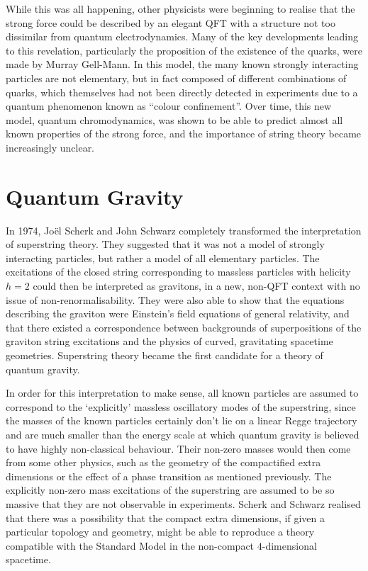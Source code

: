 \documentclass[12pt]{article}
\begin{document}
While this was all happening, other physicists were beginning to realise that the strong force could be described by an elegant QFT with a structure not too dissimilar from quantum electrodynamics. Many of the key developments leading to this revelation, particularly the proposition of the existence of the quarks, were made by Murray Gell-Mann. In this model, the many known strongly interacting particles are not elementary, but in fact composed of different combinations of quarks, which themselves had not been directly detected in experiments due to a quantum phenomenon known as ``colour confinement''. Over time, this new model, quantum chromodynamics, was shown to be able to predict almost all known properties of the strong force, and the importance of string theory became increasingly unclear.

\section{Quantum Gravity}

In 1974, Joël Scherk and John Schwarz completely transformed the interpretation of superstring theory. They suggested that it was not a model of strongly interacting particles, but rather a model of all elementary particles. The excitations of the closed string corresponding to massless particles with helicity $h=2$ could then be interpreted as gravitons, in a new, non-QFT context with no issue of non-renormalisability. They were also able to show that the equations describing the graviton were Einstein's field equations of general relativity, and that there existed a correspondence between backgrounds of superpositions of the graviton string excitations and the physics of curved, gravitating spacetime geometries. Superstring theory became the first candidate for a theory of quantum gravity.
\newline

In order for this interpretation to make sense, all known particles are assumed to correspond to the `explicitly' massless oscillatory modes of the superstring, since the masses of the known particles certainly don't lie on a linear Regge trajectory and are much smaller than the energy scale at which quantum gravity is believed to have highly non-classical behaviour. Their non-zero masses would then come from some other physics, such as the geometry of the compactified extra dimensions or the effect of a phase transition as mentioned previously. The explicitly non-zero mass excitations of the superstring are assumed to be so massive that they are not observable in experiments. Scherk and Schwarz realised that there was a possibility that the compact extra dimensions, if given a particular topology and geometry, might be able to reproduce a theory compatible with the Standard Model in the non-compact $4$-dimensional spacetime.
\newline
\end{document}
